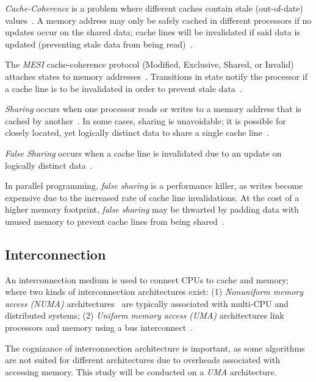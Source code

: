 \emph{Cache-Coherence} is a problem where different caches contain stale
(out-of-date) values~\citep[Appendix~B.5.1]{herlihy2020art}. A memory address
may only be safely cached in different processors if no updates
occur on the shared data; cache lines will be
invalidated if said data is updated (preventing stale data from being read)~\citep[Appendix~B.5.1]{herlihy2020art}. 

The \emph{MESI} cache-coherence protocol (Modified, Exclusive, Shared,
or Invalid) attaches states to memory addresses~\citep[Appendix~B.5.1]{herlihy2020art}. Transitions in
state notify the processor if a cache line is to be invalidated in order to
prevent stale data~\citep[Appendix~B.5.1]{herlihy2020art}.

\emph{Sharing} occurs when one processor reads or writes to a memory address that
is cached by another~\citep[Appendix~B.5.1]{herlihy2020art}. In some cases, sharing is unavoidable; it is possible for closely located, yet
logically distinct data to share a single cache
line~\citep[Appendix~B.5.1]{herlihy2020art}. 

\emph{False Sharing} occurs when a cache line is invalidated due to an update
on logically distinct data~\citep[Appendix~B.5.1]{herlihy2020art}. 

In parallel programming, \emph{false sharing} is a
performance killer, as writes become expensive due to the increased rate of
cache line invalidations. At the cost of a higher memory footprint, \emph{false
sharing} may be thwarted by padding data with unused memory to prevent cache
lines from being shared~\citep{scott2013shared}.

\subsection{Interconnection}

An interconnection medium is used to connect CPUs to cache and memory; where
two kinds of interconnection architectures exist: (1)
\emph{Nonuniform memory access (NUMA)}
architectures~\citep[Appendix~B.3]{herlihy2020art} are typically associated with
multi-CPU and distributed systems; (2) \emph{Uniform memory
access (UMA)} architectures link processors and memory using a bus
interconnect~\citep[Appendix~B.3]{herlihy2020art}.

The cognizance of interconnection architecture is important,
as some algorithms are not suited for different architectures due to
overheads associated with accessing memory. This study will be
conducted on a \emph{UMA} architecture.

